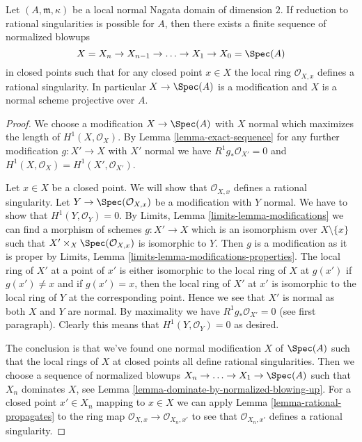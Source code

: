 \begin{lemma}
\label{lemma-reduce-to-rational}
Let $(A, \mathfrak m, \kappa)$ be a local normal Nagata domain
of dimension $2$. If reduction to rational singularities is possible
for $A$, then there exists a finite sequence of normalized blowups
$$
X = X_n \to X_{n - 1} \to \ldots \to X_1 \to X_0 = \Spec(A)
$$
in closed points such that for any closed point $x \in X$
the local ring $\mathcal{O}_{X, x}$ defines a rational singularity.
In particular $X \to \Spec(A)$ is a modification and $X$
is a normal scheme projective over $A$.
\end{lemma}

\begin{proof}
We choose a modification $X \to \Spec(A)$ with $X$ normal
which maximizes the length of $H^1(X, \mathcal{O}_X)$.
By Lemma \ref{lemma-exact-sequence}
for any further modification $g : X' \to X$ with $X'$ normal
we have $R^1g_*\mathcal{O}_{X'} = 0$ and
$H^1(X, \mathcal{O}_X) = H^1(X', \mathcal{O}_{X'})$.

\medskip\noindent
Let $x \in X$ be a closed point. We will show that $\mathcal{O}_{X, x}$
defines a rational singularity. Let $Y \to \Spec(\mathcal{O}_{X, x})$
be a modification with $Y$ normal. We have to show that
$H^1(Y, \mathcal{O}_Y) = 0$. By
Limits, Lemma \ref{limits-lemma-modifications}
we can find a morphism of schemes $g : X' \to X$ which is an isomorphism
over $X \setminus \{x\}$ such that $X' \times_X \Spec(\mathcal{O}_{X, x})$
is isomorphic to $Y$. Then $g$ is a modification as it is proper by
Limits, Lemma \ref{limits-lemma-modifications-properties}.
The local ring of $X'$ at a point of $x'$ is either isomorphic
to the local ring of $X$ at $g(x')$ if $g(x') \not = x$ and
if $g(x') = x$, then the local ring of $X'$ at $x'$ is isomorphic
to the local ring of $Y$ at the corresponding point. Hence we see
that $X'$ is normal as both $X$ and $Y$ are normal. By maximality
we have $R^1g_*\mathcal{O}_{X'} = 0$ (see first paragraph). Clearly
this means that $H^1(Y, \mathcal{O}_Y) = 0$ as desired.

\medskip\noindent
The conclusion is that we've found one normal modification $X$
of $\Spec(A)$ such that the local rings of $X$ at closed points all define
rational singularities. Then we choose a sequence of normalized
blowups $X_n \to \ldots \to X_1 \to \Spec(A)$ such that $X_n$
dominates $X$, see Lemma \ref{lemma-dominate-by-normalized-blowing-up}.
For a closed point $x' \in X_n$ mapping to $x \in X$ we can apply
Lemma \ref{lemma-rational-propagates} to the ring map
$\mathcal{O}_{X, x} \to \mathcal{O}_{X_n, x'}$
to see that $\mathcal{O}_{X_n, x'}$ defines a rational singularity.
\end{proof}

